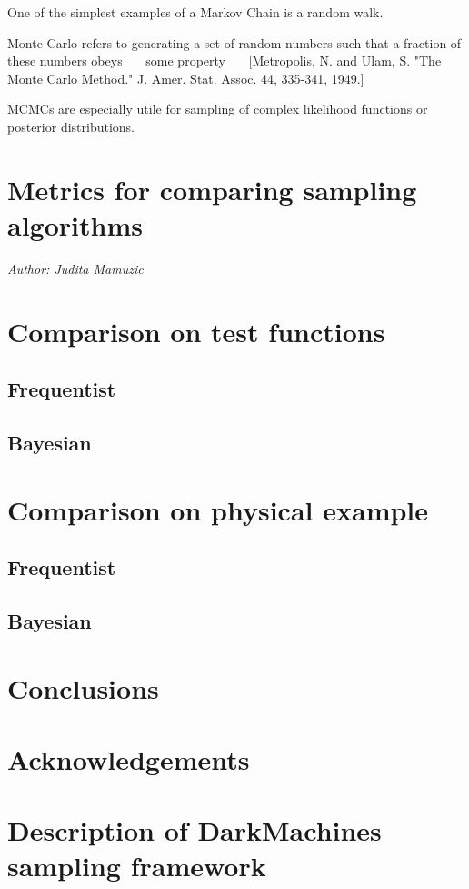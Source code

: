 \documentclass[11pt]{article}
\begin{document}
One of the simplest examples of a Markov Chain is a random walk.

Monte Carlo refers to generating a set of random numbers such that a fraction of these numbers obeys ~~~some property~~~
[Metropolis, N. and Ulam, S. "The Monte Carlo Method." J. Amer. Stat. Assoc. 44, 335-341, 1949.]

MCMCs are especially utile for sampling of complex likelihood functions or posterior distributions. 

\section{Metrics for comparing sampling algorithms}
\label{sec:metrics}
\emph{Author: Judita Mamuzic}

\section{Comparison on test functions}
\label{sec:test}
\subsection{Frequentist}
\subsection{Bayesian}

\section{Comparison on physical example}
\label{sec:physics}
\subsection{Frequentist}
\subsection{Bayesian}

\section{Conclusions}\label{Conclusions}
\label{sec:conclusions}
\section{Acknowledgements}



\appendix
\section{Description of DarkMachines sampling framework}
\label{app:python}
\end{document}
